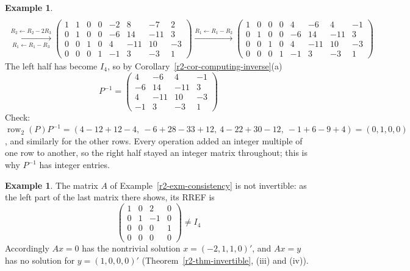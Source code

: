 \documentclass[12pt]{article}
\DeclareMathOperator{\row}{row}
\theoremstyle{definition}
\newtheorem{example}[theorem]{Example}
\begin{document}
\begin{example}
\[\begin{gathered}
\\
\xrightarrow[R_1\leftarrow R_1-R_3]{R_2\leftarrow R_2-2R_3}
\left(\begin{array}{cccc|cccc}1&1&0&0&-2&8&-7&2\\0&1&0&0&-6&14&-11&3\\0&0&1&0&4&-11&10&-3\\0&0&0&1&-1&3&-3&1\end{array}\right)
\xrightarrow{R_1\leftarrow R_1-R_2}
\left(\begin{array}{cccc|cccc}1&0&0&0&4&-6&4&-1\\0&1&0&0&-6&14&-11&3\\0&0&1&0&4&-11&10&-3\\0&0&0&1&-1&3&-3&1\end{array}\right)
\end{gathered}
\]
The left half has become \(I_4\), so by Corollary~\ref{r2-cor-computing-inverse}(a)
\[
P^{-1}=\begin{pmatrix}4&-6&4&-1\\-6&14&-11&3\\4&-11&10&-3\\-1&3&-3&1\end{pmatrix}
\]
Check: \(\row_2(P)P^{-1}=(4-12+12-4,\ -6+28-33+12,\ 4-22+30-12,\ -1+6-9+4)=(0,1,0,0)\), and
similarly for the other rows. Every operation added an integer multiple of one row to another,
so the right half stayed an integer matrix throughout; this is why \(P^{-1}\) has integer
entries.
\end{example}

\begin{example}\label{r2-exm-singular}
The matrix \(A\) of Example~\ref{r2-exm-consistency} is not invertible: as the left part of the last matrix there
shows, its RREF is
\[
\begin{pmatrix}1&0&2&0\\0&1&-1&0\\0&0&0&1\\0&0&0&0\end{pmatrix}\ne I_4
\]
Accordingly \(Ax=0\) has the nontrivial solution
\(x=(-2,1,1,0)'\), and \(Ax=y\) has no solution for \(y=(1,0,0,0)'\)
(Theorem~\ref{r2-thm-invertible}, (iii) and (iv)).
\end{example}
\end{document}
